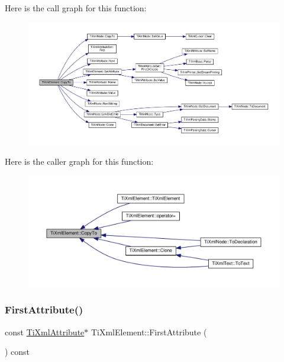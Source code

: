 Here is the call graph for this function\+:\nopagebreak
\begin{figure}[H]
\begin{center}
\leavevmode
\includegraphics[width=350pt]{class_ti_xml_element_ab931f2208ed76ba03465d8a1f86b5935_cgraph}
\end{center}
\end{figure}
Here is the caller graph for this function\+:\nopagebreak
\begin{figure}[H]
\begin{center}
\leavevmode
\includegraphics[width=350pt]{class_ti_xml_element_ab931f2208ed76ba03465d8a1f86b5935_icgraph}
\end{center}
\end{figure}
\mbox{\label{class_ti_xml_element_a003131b1bbf0b8054b11571c1b9a4d3a}} 
\subsubsection{\texorpdfstring{First\+Attribute()}{FirstAttribute()}\hspace{0.1cm}{\footnotesize\ttfamily [1/2]}}
{\footnotesize\ttfamily const \hyperlink{class_ti_xml_attribute}{Ti\+Xml\+Attribute}$\ast$ Ti\+Xml\+Element\+::\+First\+Attribute (\begin{DoxyParamCaption}{ }\end{DoxyParamCaption}) const\hspace{0.3cm}{\ttfamily [inline]}}



